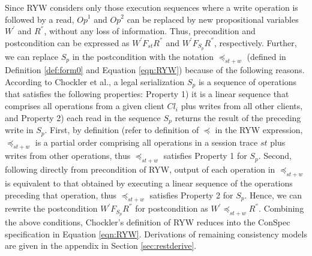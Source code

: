 \documentclass[journal,compsoc]{IEEEtran}
\begin{document}
  Since RYW considers only those execution sequences where a write operation is followed by a read, $\mathit{Op}^1$ and $\mathit{Op}^2$ can be  replaced  by new propositional variables
   $W^{'}$ and $R^{''}$, without any loss of information. Thus, precondition and postcondition can be expressed as  $W^{'} F_\mathit{st} R^{''}$ and $W^{'} F_{S_p}  R^{''} $, respectively. Further, we can replace $S_p$ in the postcondition with the notation  $\preccurlyeq_{\mathit{st}+w}$ (defined in Definition \ref{def:form0} and Equation \ref{eqn:RYW}) because of the following reasons.  According to Chockler et al., a legal serialization $S_p$ is a sequence of operations that satisfies the following properties: Property 1) it is a linear sequence that comprises all operations from a given client $\mathit{Cl}_i$ plus writes from all other clients, and Property 2) each read in the sequence $S_p$ returns the result of the preceding write in $S_p$.  First, by definition (refer to definition of $\preccurlyeq$ in the RYW expression, $\preccurlyeq_{\mathit{st}+w}$ is a partial order  comprising all operations in a session trace $\mathit{st}$ plus writes from other operations, thus $\preccurlyeq_{\mathit{st}+w}$ satisfies Property 1 for $S_p$. Second, following directly from precondition of RYW, output of each operation in $\preccurlyeq_{\mathit{st}+w}$ is equivalent to that obtained by executing a linear sequence of the operations preceding that operation, thus $\preccurlyeq_{\mathit{st}+w}$ satisfies Property 2 for $S_p$. Hence, we can rewrite the postcondition $W^{'} F_{S_p} R^{''} $  for postcondition as  $W^{'} \preccurlyeq_{\mathit{st}+w} R^{''}$. Combining the above conditions, Chockler's definition of RYW reduces into the ConSpec specification in Equation \ref{eqn:RYW}.  Derivations of remaining consistency models  are given in the appendix in Section \ref{sec:restderive}.
\end{document}
